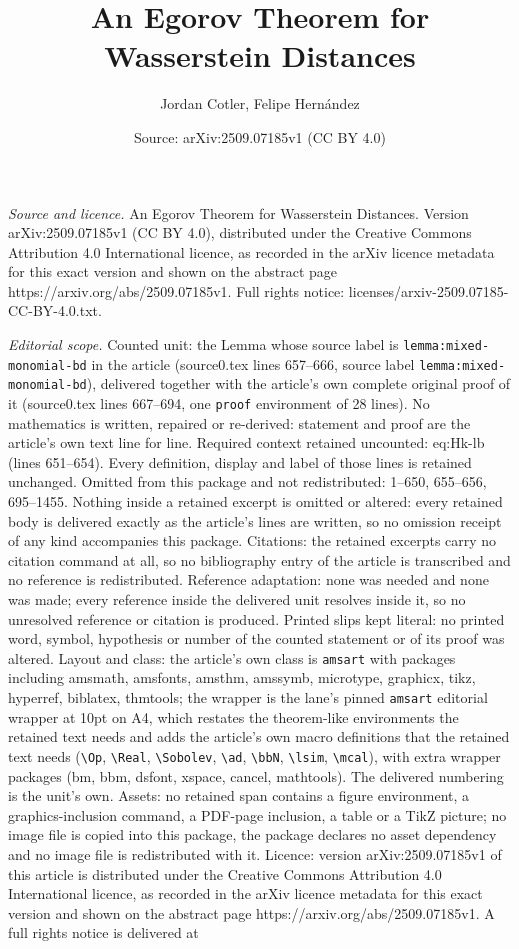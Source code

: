 \documentclass[10pt,a4paper]{amsart}
\title[An Egorov Theorem for Wasserstein Distances]{An Egorov Theorem for Wasserstein Distances}
\author{Jordan Cotler, Felipe Hern\'andez}
\date{Source: arXiv:2509.07185v1 (CC BY 4.0)}
\begin{document}
\maketitle

\noindent\emph{Source and licence.} An Egorov Theorem for Wasserstein Distances. Version arXiv:2509.07185v1 (CC BY 4.0), distributed under the Creative Commons Attribution 4.0 International licence, as recorded in the arXiv licence metadata for this exact version and shown on the abstract page https://arxiv.org/abs/2509.07185v1. Full rights notice: licenses/arxiv-2509.07185-CC-BY-4.0.txt.\par\smallskip

\noindent\textit{Editorial scope.} Counted unit: the Lemma whose source label is \texttt{lemma:mixed-monomial-bd} in the article (source0.tex lines 657--666, source label \texttt{lemma:mixed-monomial-bd}), delivered together with the article's own complete original proof of it (source0.tex lines 667--694, one \texttt{proof} environment of 28 lines). No mathematics is written, repaired or re-derived: statement and proof are the article's own text line for line. Required context retained uncounted: eq:Hk-lb (lines 651--654). Every definition, display and label of those lines is retained unchanged. Omitted from this package and not redistributed: 1--650, 655--656, 695--1455. Nothing inside a retained excerpt is omitted or altered: every retained body is delivered exactly as the article's lines are written, so no omission receipt of any kind accompanies this package. Citations: the retained excerpts carry no citation command at all, so no bibliography entry of the article is transcribed and no reference is redistributed. Reference adaptation: none was needed and none was made; every reference inside the delivered unit resolves inside it, so no unresolved reference or citation is produced. Printed slips kept literal: no printed word, symbol, hypothesis or number of the counted statement or of its proof was altered. Layout and class: the article's own class is \texttt{amsart} with packages including amsmath, amsfonts, amsthm, amssymb, microtype, graphicx, tikz, hyperref, biblatex, thmtools; the wrapper is the lane's pinned \texttt{amsart} editorial wrapper at 10pt on A4, which restates the theorem-like environments the retained text needs and adds the article's own macro definitions that the retained text needs (\texttt{\textbackslash Op}, \texttt{\textbackslash Real}, \texttt{\textbackslash Sobolev}, \texttt{\textbackslash ad}, \texttt{\textbackslash bbN}, \texttt{\textbackslash lsim}, \texttt{\textbackslash mcal}), with extra wrapper packages (bm, bbm, dsfont, xspace, cancel, mathtools). The delivered numbering is the unit's own. Assets: no retained span contains a figure environment, a graphics-inclusion command, a PDF-page inclusion, a table or a TikZ picture; no image file is copied into this package, the package declares no asset dependency and no image file is redistributed with it. Licence: version arXiv:2509.07185v1 of this article is distributed under the Creative Commons Attribution 4.0 International licence, as recorded in the arXiv licence metadata for this exact version and shown on the abstract page https://arxiv.org/abs/2509.07185v1. A full rights notice is delivered at 
\end{document}

